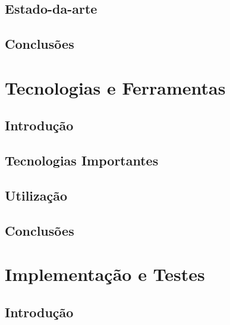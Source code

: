 \documentclass[12pt,a4paper]{memoir}
\begin{document}
\section{Estado-da-arte}
\label{chap2:sec:estado}


\section{Conclusões}
\label{chap2:sec:concs}

\clearpage{\thispagestyle{empty}\cleardoublepage}



\chapter{Tecnologias e Ferramentas}
\label{chap:tecno-ferra}

\section{Introdução}
\label{chap3:sec:intro}

\section{Tecnologias Importantes}
\label{chap3:sec:tecno-imp}

\newpage

\section{Utilização}
\label{chap3:util}


\section{Conclusões}
\label{chap3:sec:concs}

\clearpage{\thispagestyle{empty}\cleardoublepage}



\chapter{Implementação e Testes}
\label{chap:imp-test}

\section{Introdução}
\label{chap4:sec:intro}
\end{document}

